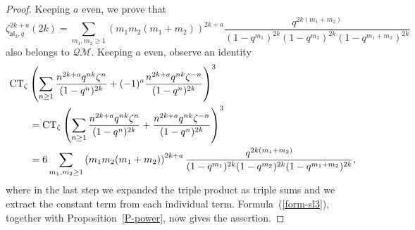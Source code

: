 \documentclass[10pt,a4paper]{amsart}
\numberwithin{equation}{section}
\theoremstyle{definition}
\begin{document}
\begin{proof} Keeping $a$ even, we prove that
\[
\zeta_{\mathfrak{sl}_3,q}^{2k+a}(2k)=\sum_{m_1,m_2 \geq 1} \left( m_1 m_2 (m_1+m_2) \right)^{2k+a} \frac{q^{2k(m_1 +m_2)}}{(1-q^{m_1})^{2k} (1-q^{m_2})^{2k}(1-q^{m_1+m_2})^{2k}}
\]
also belongs to $\mathcal{QM}$.
Keeping $a$ even, observe an identity
\begin{align*}
& {\rm CT}_{\zeta} \left(\sum_{n \geq 1} \frac{n^{2k+a} q^{nk} \zeta^{n}}{(1-q^n)^{2k}}+(-1)^a \frac{n^{2k+a} q^{n k} \zeta^{-n}}{(1-q^n)^{2k}} \right)^3 \\
&\qquad = {\rm CT}_{\zeta} \left(\sum_{n \geq 1} \frac{n^{2k+a} q^{nk} \zeta^{n}}{(1-q^n)^{2k}}+ \frac{n^{2k+a} q^{n k} \zeta^{-n}}{(1-q^n)^{2k}} \right)^3 \\
& \qquad =6 \sum_{m_1,m_2 \geq 1} \left( m_1 m_2 (m_1+m_2) \right)^{2k+a} \frac{q^{2k(m_1 +m_2)}}{(1-q^{m_1})^{2k} (1-q^{m_2})^{2k}(1-q^{m_1+m_2})^{2k}},
\end{align*}
where in the last step we expanded the triple product as triple sums and we extract the constant term from each individual term.
Formula~(\ref{form-sl3}), together with Proposition~\ref{P-power}, now gives the assertion.
\end{proof}
\end{document}
